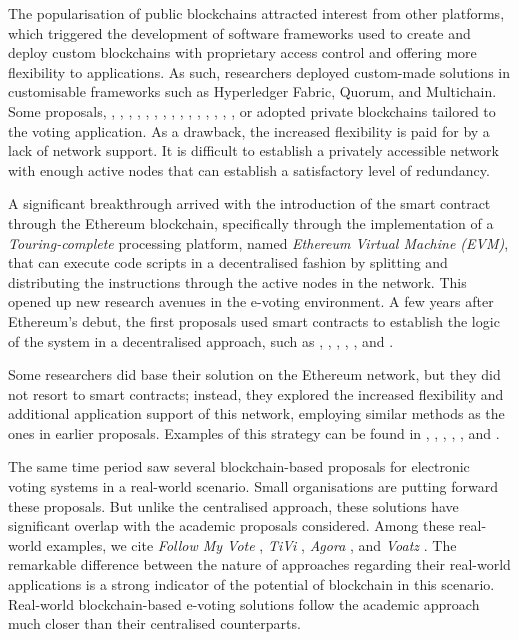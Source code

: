\documentclass[../main.tex]{subfiles}
\begin{document}
    \par
    The popularisation of public blockchains attracted interest from other platforms, which triggered the development of software frameworks used to create and deploy custom blockchains with proprietary access control and offering more flexibility to applications. As such, researchers deployed custom-made solutions in customisable frameworks such as Hyperledger Fabric, Quorum, and Multichain. Some proposals, \cite{Kirby2016}, \cite{BenAyed2017}, \cite{Chaieb2018}, \cite{Burhanuddin2018}, \cite{Zhang2018}, \cite{Khan2018}, \cite{Murtaza2019}, \cite{Faour2019}, \cite{Killer2020}, \cite{Han2020}, \cite{Vivek2020}, \cite{Mani2022}, \cite{Zhou2020}, \cite{Alvi2022}, \cite{Hassan2022}, \cite{Vidwans2022} or \cite{Matile2019} adopted private blockchains tailored to the voting application. As a drawback, the increased flexibility is paid for by a lack of network support. It is difficult to establish a privately accessible network with enough active nodes that can establish a satisfactory level of redundancy.
    \par
    A significant breakthrough arrived with the introduction of the smart contract through the Ethereum blockchain, specifically through the implementation of a \textit{Touring-complete} processing platform, named \textit{Ethereum Virtual Machine (EVM)}, that can execute code scripts in a decentralised fashion by splitting and distributing the instructions through the active nodes in the network. This opened up new research avenues in the e-voting environment. A few years after Ethereum's debut, the first proposals used smart contracts to establish the logic of the system in a decentralised approach, such as \cite{McCorry2017}, \cite{Koc2018}, \cite{Dagher2018}, \cite{Fusco2018}, \cite{Hjalmarsson2018}, and \cite{Mols2020}.
    \par
    Some researchers did base their solution on the Ethereum network, but they did not resort to smart contracts; instead, they explored the increased flexibility and additional application support of this network, employing similar methods as the ones in earlier proposals. Examples of this strategy can be found in \cite{Hardwick2018}, \cite{Wang2018}, \cite{Hsiao2018}, \cite{Lai2018}, \cite{Shukla2018}, and \cite{Vo-Cao-Thuy2019}.
    \par
    The same time period saw several blockchain-based proposals for electronic voting systems in a real-world scenario. Small organisations are putting forward these proposals. But unlike the centralised approach, these solutions have significant overlap with the academic proposals considered. Among these real-world examples, we cite \textit{Follow My Vote} \cite{Ernest2021}, \textit{TiVi} \cite{TiVi2021}, \textit{Agora} \cite{AgoraWhitePaper2021}, and \textit{Voatz} \cite{Voatz2021}. The remarkable difference between the nature of approaches regarding their real-world applications is a strong indicator of the potential of blockchain in this scenario. Real-world blockchain-based e-voting solutions follow the academic approach much closer than their centralised counterparts.
\end{document}
